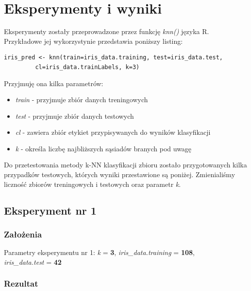 \documentclass[12pt]{article}
\begin{document}
\newpage

\section{Eksperymenty i wyniki}

Eksperymenty zostały przeprowadzone przez funkcję \textit{knn()} języka R. Przykładowe jej wykorzystynie przedstawia poniższy listing:\\
{\footnotesize
\begin{lstlisting}
iris_pred <- knn(train=iris_data.training, test=iris_data.test, 
		 cl=iris_data.trainLabels, k=3)
\end{lstlisting}
}

Przyjmuję ona kilka parametrów:
\begin{itemize}
\item \textit{train} - przyjmuje zbiór danych treningowych
\item \textit{test} - przyjmuje zbiór danych testowych
\item \textit{cl} - zawiera zbiór etykiet przypisywanych do wyników klasyfikacji
\item \textit{k} - określa liczbę najbliższych sąsiadów branych pod uwagę
\end{itemize}

Do przetestowania metody k-NN klasyfikacji zbioru zostało przygotowanych kilka przypadków testowych, których wyniki przestawione są poniżej. Zmienialiśmy liczność zbiorów treningowych i testowych oraz parametr \textit{k}.

\subsection{Eksperyment nr 1}
\subsubsection{Założenia}

Parametry eksperymentu nr 1: \textit{k} = \textbf{3}, \textit{iris\_data.training} = \textbf{108}, \\ \textit{iris\_data.test} = \textbf{42}

\subsubsection{Rezultat}
\end{document}
